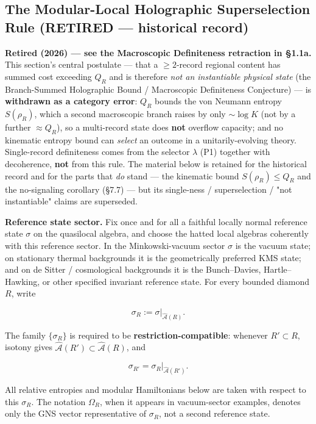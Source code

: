 \documentclass[11pt,a4paper]{article}
\newenvironment{qiqtquote}{\begin{mdframed}[style=quotestyle]}{\end{mdframed}}
\begin{document}
\subsection{The Modular-Local Holographic Superselection Rule (RETIRED — historical record)}

\begin{qiqtquote}
\textbf{Retired (2026) — see the Macroscopic Definiteness retraction in §1.1a.} This section's central postulate — that a $\ge 2$-record regional content has summed cost exceeding $Q_R$ and is therefore \emph{not an instantiable physical state} (the Branch-Summed Holographic Bound / Macroscopic Definiteness Conjecture) — is \textbf{withdrawn as a category error}: $Q_R$ bounds the von Neumann entropy $S(\rho_R)$, which a second macroscopic branch raises by only $\sim\!\log K$ (not by a further $\approx Q_R$), so a multi-record state does \textbf{not} overflow capacity; and no kinematic entropy bound can \emph{select} an outcome in a unitarily-evolving theory. Single-record definiteness comes from the selector $\lambda$ (P1) together with decoherence, \textbf{not} from this rule. The material below is retained for the historical record and for the parts that \emph{do} stand — the kinematic bound $S(\rho_R)\le Q_R$ and the no-signaling corollary (§7.7) — but its single-ness / superselection / "not instantiable" claims are superseded.
\end{qiqtquote}

\textbf{Reference state sector.} Fix once and for all a faithful locally normal reference state $\sigma$ on the quasilocal algebra, and choose the hatted local algebras coherently with this reference sector. In the Minkowski-vacuum sector $\sigma$ is the vacuum state; on stationary thermal backgrounds it is the geometrically preferred KMS state; and on de Sitter / cosmological backgrounds it is the Bunch–Davies, Hartle–Hawking, or other specified invariant reference state. For every bounded diamond $R$, write

\[
\sigma_R := \sigma|_{\hat{\mathcal{A}}(R)}.
\]

The family $\{\sigma_R\}$ is required to be \textbf{restriction-compatible}: whenever $R' \subset R$, isotony gives $\hat{\mathcal{A}}(R') \subset \hat{\mathcal{A}}(R)$, and

\[
\sigma_{R'} = \sigma_R |_{\hat{\mathcal{A}}(R')}.
\]

All relative entropies and modular Hamiltonians below are taken with respect to this $\sigma_R$. The notation $\Omega_R$, when it appears in vacuum-sector examples, denotes only the GNS vector representative of $\sigma_R$, not a second reference state.
\end{document}
